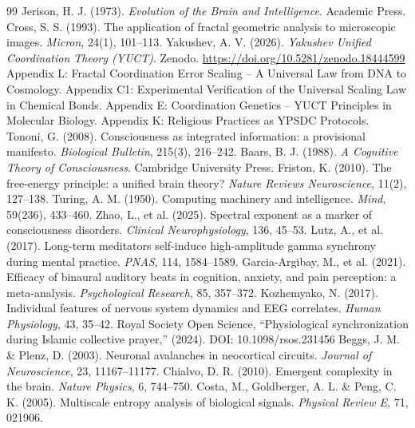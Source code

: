 \documentclass[12pt,a4paper]{article}
\begin{document}
	\begin{thebibliography}{99}
		 Jerison, H. J. (1973). \emph{Evolution of the Brain and Intelligence}. Academic Press.
		 Cross, S. S. (1993). The application of fractal geometric analysis to microscopic images. \emph{Micron}, 24(1), 101–113.
		 Yakushev, A. V. (2026). \emph{Yakushev Unified Coordination Theory (YUCT)}. Zenodo. \url{https://doi.org/10.5281/zenodo.18444599}
		 Appendix L: Fractal Coordination Error Scaling – A Universal Law from DNA to Cosmology.
		 Appendix C1: Experimental Verification of the Universal Scaling Law in Chemical Bonds.
		 Appendix E: Coordination Genetics – YUCT Principles in Molecular Biology.
		 Appendix K: Religious Practices as YPSDC Protocols.
		 Tononi, G. (2008). Consciousness as integrated information: a provisional manifesto. \emph{Biological Bulletin}, 215(3), 216–242.
		 Baars, B. J. (1988). \emph{A Cognitive Theory of Consciousness}. Cambridge University Press.
		 Friston, K. (2010). The free-energy principle: a unified brain theory? \emph{Nature Reviews Neuroscience}, 11(2), 127–138.
		 Turing, A. M. (1950). Computing machinery and intelligence. \emph{Mind}, 59(236), 433–460.
		 Zhao, L., et al. (2025). Spectral exponent as a marker of consciousness disorders. \emph{Clinical Neurophysiology}, 136, 45–53.
		 Lutz, A., et al. (2017). Long-term meditators self-induce high-amplitude gamma synchrony during mental practice. \emph{PNAS}, 114, 1584–1589.
		 Garcia-Argibay, M., et al. (2021). Efficacy of binaural auditory beats in cognition, anxiety, and pain perception: a meta-analysis. \emph{Psychological Research}, 85, 357–372.
		 Kozhemyako, N. (2017). Individual features of nervous system dynamics and EEG correlates. \emph{Human Physiology}, 43, 35–42.
		 Royal Society Open Science, ``Physiological synchronization during Islamic collective prayer,'' (2024). DOI: 10.1098/rsos.231456
		 Beggs, J. M. \& Plenz, D. (2003). Neuronal avalanches in neocortical circuits. \emph{Journal of Neuroscience}, 23, 11167–11177.
		 Chialvo, D. R. (2010). Emergent complexity in the brain. \emph{Nature Physics}, 6, 744–750.
		 Costa, M., Goldberger, A. L. \& Peng, C. K. (2005). Multiscale entropy analysis of biological signals. \emph{Physical Review E}, 71, 021906.

\end{thebibliography}
\end{document}
